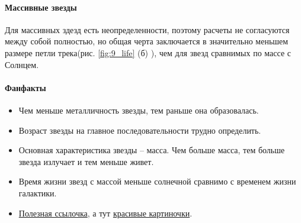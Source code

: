 \paragraph{Массивные звезды} Для массивных здезд есть неопределенности, поэтому расчеты не согласуются между собой полностью, но общая черта заключается в значительно меньшем размере петли трека(рис. \ref{fig:9_life} (б) ), чем для звезд сравнимых по массе с Солнцем. 


    
\paragraph{Фанфакты} 

\begin{itemize}
    \item Чем меньше металличность звезды, тем раньше она образовалась.
    \item Возраст звезды на главное последовательности трудно определить.
    \item Основная характеристика звезды -- масса. Чем больше масса, тем больше звезда излучает и тем меньше живет.
    \item Время жизни звезд с массой меньше солнечной сравнимо с временем жизни галактики.
    \item \href{http://nuclphys.sinp.msu.ru/m_un/mun16.htm}{Полезная ссылочка}, а тут \href{https://habr.com/ru/post/366947/}{красивые картиночки}.
\end{itemize}
